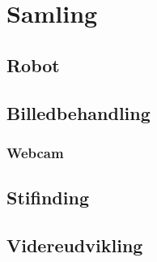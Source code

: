 \chapter{Samling}

\section{Robot}
\section{Billedbehandling}
\subsection{Webcam}
\section{Stifinding}
\section{Videreudvikling}